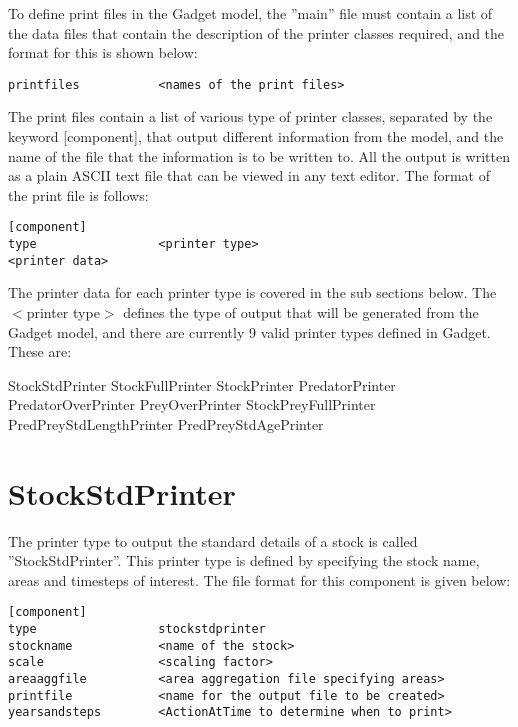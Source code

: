 \documentclass [a4paper, 10pt]{book}
\begin{document}
\bigskip
To define print files in the Gadget model, the ''main'' file must contain a list of the data files that contain the description of the printer classes required, and the format for this is shown below:

{\small\begin{verbatim}
printfiles           <names of the print files>
\end{verbatim}}

The print files contain a list of various type of printer classes, separated by the keyword [component], that output different information from the model, and the name of the file that the information is to be written to.  All the output is written as a plain ASCII text file that can be viewed in any text editor.  The format of the print file is follows:

{\small\begin{verbatim}
[component]
type                 <printer type>
<printer data>
\end{verbatim}}

The printer data for each printer type is covered in the sub sections below.  The $<$printer type$>$ defines the type of output that will be generated from the Gadget model, and there are currently 9 valid printer types defined in Gadget.  These are:

\bigskip
StockStdPrinter\newline
StockFullPrinter\newline
StockPrinter\newline
PredatorPrinter\newline
PredatorOverPrinter\newline
PreyOverPrinter\newline
StockPreyFullPrinter\newline
PredPreyStdLengthPrinter\newline
PredPreyStdAgePrinter

\newpage
\section{StockStdPrinter}\label{sec:stockstdprinter}
The printer type to output the standard details of a stock is called ''StockStdPrinter''.  This printer type is defined by specifying the stock name, areas and timesteps of interest.  The file format for this component is given below:

{\small\begin{verbatim}
[component]
type                 stockstdprinter
stockname            <name of the stock>
scale                <scaling factor>
areaaggfile          <area aggregation file specifying areas>
printfile            <name for the output file to be created>
yearsandsteps        <ActionAtTime to determine when to print>
\end{verbatim}}
\end{document}
